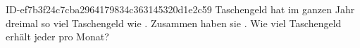 \begin{exercise}
      {ID-ef7b3f24c7cba2964179834c363145320d1e2c59}
      {Taschengeld}
  \ifproblem\problem
    \xya{} hat im ganzen Jahr dreimal so viel Taschengeld wie \xyb.
    Zusammen haben sie . Wie viel Taschengeld erhält jeder pro Monat?
  \fi
\end{exercise}

